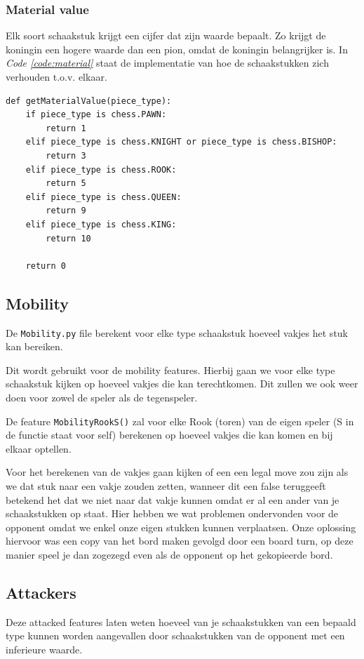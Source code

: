 \documentclass[a4paper,openany]{uantwerpenassignment}
\newcommand{\codeword}[1]{
    \colorbox{code}{\texttt{\textcolor{codetext}{#1}}}
}
\newcommand{\coderef}[1]{\textit{Code \ref{#1}}}
\begin{document}
\subsubsection{Material value}
Elk soort schaakstuk krijgt een cijfer dat zijn waarde bepaalt. Zo krijgt de koningin een hogere waarde dan een pion, omdat de koningin belangrijker is. In \coderef{code:material} staat de implementatie van hoe de schaakstukken zich verhouden t.o.v. elkaar.

\begin{lstlisting}[style=mypython,caption={Material Function},captionpos=b,label={code:material}]
def getMaterialValue(piece_type):
    if piece_type is chess.PAWN:
        return 1
    elif piece_type is chess.KNIGHT or piece_type is chess.BISHOP:
        return 3
    elif piece_type is chess.ROOK:
        return 5
    elif piece_type is chess.QUEEN:
        return 9
    elif piece_type is chess.KING:
        return 10

    return 0
\end{lstlisting}

\subsection{Mobility}
De \codeword{Mobility.py} file berekent voor elke type schaakstuk hoeveel vakjes het stuk kan bereiken. 

Dit wordt gebruikt voor de mobility features. Hierbij gaan we voor elke type schaakstuk kijken op hoeveel vakjes die kan terechtkomen. Dit zullen we ook weer doen voor zowel de speler als de tegenspeler.

De feature \codeword{MobilityRookS()} zal voor elke Rook (toren) van de eigen speler (S in de functie staat voor self) berekenen op hoeveel vakjes die kan komen en bij elkaar optellen.

Voor het berekenen van de vakjes gaan kijken of een een legal move zou zijn als we dat stuk naar een vakje zouden zetten, wanneer dit een false teruggeeft betekend het dat we niet naar dat vakje kunnen omdat er al een ander van je schaakstukken op staat. Hier hebben we wat problemen ondervonden voor de opponent omdat we enkel onze eigen stukken kunnen verplaatsen. Onze oplossing hiervoor was een copy van het bord maken gevolgd door een board turn, op deze manier speel je dan zogezegd even als de opponent op het gekopieerde bord. 
\pagebreak

\pagebreak

\subsection{Attackers}
Deze attacked features laten weten hoeveel van je schaakstukken van een bepaald type kunnen worden aangevallen door schaakstukken van de opponent met een inferieure waarde. 
\end{document}
